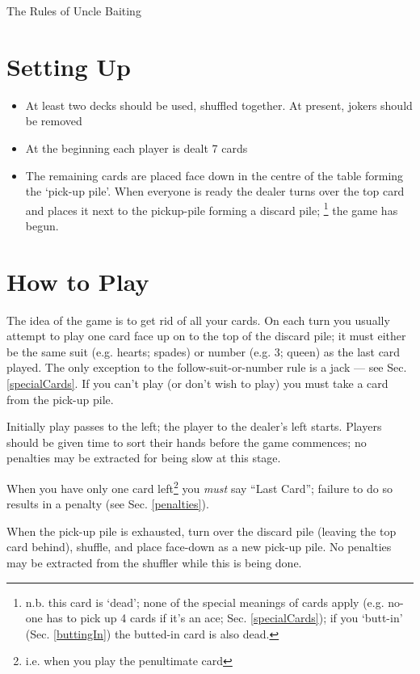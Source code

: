 \documentclass[12pt]{article}
\newcommand{\Sec}[1]{Sec. \ref{#1}}
\begin{document}
\begin{center}
  \Large The Rules of Uncle Baiting
\end{center}


\section{Setting Up}

\begin{itemize}
\item At least two decks should be used, shuffled together.  At present, jokers should be removed
  
\item At the beginning each player is dealt 7 cards
  
\item The remaining cards are placed face down in the centre of the table forming the `pick-up pile'.
  When everyone is ready the dealer turns over the 
  top card and places it next to the pickup-pile forming a discard pile;%
\footnote{n.b. this card is `dead'; none of the special meanings of cards apply (e.g.
no-one has to pick up 4 cards if it's an ace; \Sec{specialCards}); if you 
`butt-in' (\Sec{buttingIn}) the butted-in card is also dead.}
the game has begun.

\end{itemize}

\section{How to Play}

The idea of the game is to get rid of all your cards.  On each turn you usually attempt to play one card face up on to
the top of the discard pile; it must either be the same suit (e.g. hearts; spades) or number (e.g.  3; queen) as the
last card played.  The only exception to the follow-suit-or-number rule is a jack --- see \Sec{specialCards}.  If you
can't play (or don't wish to play) you must take a card from the pick-up pile.

Initially play passes to the left; the player to the dealer's left starts.
Players should be given time to sort their hands before the game commences; no
penalties may be extracted for being slow at this stage.

When you have only one card left\footnote{i.e. when you play the penultimate card}
you \emph{must} say ``Last Card'';  failure to do
so results in a penalty (see \Sec{penalties}).

When the pick-up pile is exhausted, turn over the discard pile (leaving the top card behind),
shuffle, and place face-down as a new pick-up pile.  No penalties may be extracted from the
shuffler while this is being done.
\end{document}

